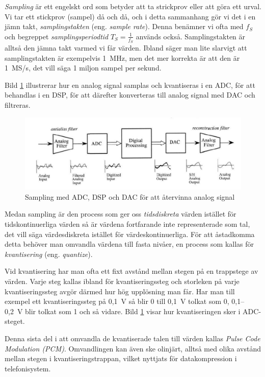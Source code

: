 \emph{Sampling} är ett engelskt ord som betyder att ta strickprov eller att göra ett urval.
Vi tar ett stickprov (sampel) då och då, och i detta sammanhang gör vi det i en jämn takt,
\emph{samplingstakten} (eng. \emph{sample rate}).
Denna benämner vi ofta med \(f_S\) och begreppet \emph{samplingsperiodtid}
\(T_S=\frac{1}{f_S}\) används också.
Samplingstakten är alltså den jämna takt varmed vi får värden.
Ibland säger man lite slarvigt att samplingstakten är exempelvis 1~MHz, men det
mer korrekta är att den är 1~MS/s, det vill säga 1 miljon sampel per sekund.

Bild \ref{fig:BildII1-37} illustrerar hur en analog signal samplas och
kvantiseras i en ADC, för att behandlas i en DSP, för att därefter konverteras
till analog signal med DAC och filtreras.

\begin{figure}
\begin{center}
\includegraphics[width=\textwidth]{images/cropped_pdfs/bild_2_1-37.pdf}
\caption{Sampling med ADC, DSP och DAC för att återvinna analog signal}
\label{fig:BildII1-37}
\end{center}
\end{figure}

Medan sampling är den process som ger oss \emph{tidsdiskreta} värden istället
för tidskontinuerliga värden så är värdena fortfarande inte representerade som
tal, det vill säga värdesdiskreta istället för värdeskontinuerliga.
För att åstadkomma detta behöver man omvandla värdena till fasta nivåer, en
process som kallas för \emph{kvantisering} (eng. \emph{quantize}).

Vid kvantisering har man ofta ett fixt avstånd mellan stegen på en
trappstege av värden. Varje steg kallas ibland för kvantiseringssteg och
storleken på varje kvantiseringssteg avgör därmed hur hög upplösning man får.
Har man till exempel ett kvantiseringssteg på 0,1~V så blir 0 till 0,1~V tolkat som
0, 0,1--0,2~V blir tolkat som 1 och så vidare.
Bild \ref{fig:BildII1-37} visar hur kvantiseringen sker i ADC-steget.

Denna sista del i att omvandla de kvantiserade talen till värden kallas
\emph{Pulse Code Modulation (PCM)}.
Omvandlingen kan även ske olinjärt, alltså med olika avstånd mellan stegen i
kvantiseringstrappan, vilket nyttjats för datakompression i telefonisystem.

